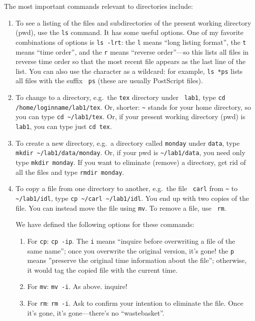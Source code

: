 \documentclass[psfig,preprint]{aastex}
\begin{document}
The most important commands relevant to directories include: \begin{enumerate}

\item To see a listing of the files and subdirectories of the present working
directory (pwd), use
the {\tt ls} command.  It has some useful
options. One of my favorite combinations of options is {\tt ls -lrt}:
the {\tt l} means ``long listing format'', the {\tt t} means ``time
order'', and the {\tt r} means ``reverse order''---so this lists all
files in reverse time order so that the most recent file appears as the
last line of the list. You can also use the {\tt *} character as a
wildcard: for example, {\tt ls *ps} lists all files with the suffix {\tt
    ps} (these are usually PostScript files). 

\item To change to a directory, e.g.\ the {\tt tex} directory under {\tt
  lab1}, type {\tt cd /home/loginname/lab1/tex}. Or, shorter: \verb$~$
  stands for your home directory, so you can type
  \verb$cd ~/lab1/tex$. Or, if your present working directory (pwd) is
  {\tt lab1}, you can type just {\tt cd tex}.


\item To create a new directory, e.g.\ a directory called {\tt monday}
  under {\tt data}, type \\ \verb$mkdir ~/lab1/data/monday$. Or, if your
  pwd is \verb$~/lab1/data$, you need only type {\tt mkdir monday}. If
  you want to eliminate (remove) a directory, get rid of all the files
  and type {\tt rmdir monday}.

\item To copy a file from one directory to another, e.g.\ the file {\tt
  carl} from \verb$~$ to \verb$~/lab1/idl$, type
  \verb$cp ~/carl ~/lab1/idl$. You end up with two copies of the file. You
  can instead move the file using {\tt mv}. To remove a file, use {\tt
  rm}.

We have defined the following options for these commands:
\begin{enumerate}

\item For {\tt cp}: {\tt cp -ip}. The {\tt i} means ``inquire before
  overwriting a file of the same name''; once you overwrite the original
  version, it's gone! the {\tt p} means ''preserve the original time
  information about the file''; otherwise, it would tag the copied file
  with the current time.

\item For {\tt mv}: {\tt mv -i}. As above. inquire!

\item For {\tt rm}: {\tt rm -i}. Ask to confirm your intention to
  eliminate the file. Once it's gone, it's gone---there's no
  ``wastebasket''. 
\end{enumerate}

\end{enumerate}
\end{document}
